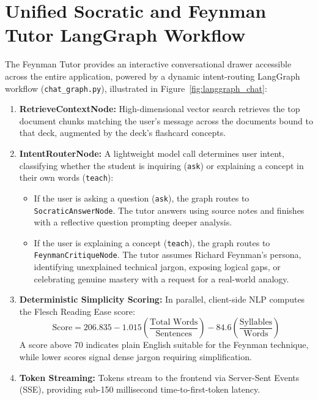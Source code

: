 \documentclass[12pt,a4paper,oneside]{report}
\begin{document}
\section{Unified Socratic and Feynman Tutor LangGraph Workflow}
The Feynman Tutor provides an interactive conversational drawer accessible across the entire application, powered by a dynamic intent-routing LangGraph workflow (\texttt{chat\_graph.py}), illustrated in Figure~\ref{fig:langgraph_chat}:
\begin{enumerate}
    \item \textbf{RetrieveContextNode:} High-dimensional vector search retrieves the top document chunks matching the user's message across the documents bound to that deck, augmented by the deck's flashcard concepts.
    \item \textbf{IntentRouterNode:} A lightweight model call determines user intent, classifying whether the student is inquiring (\texttt{ask}) or explaining a concept in their own words (\texttt{teach}):
    \begin{itemize}
        \item If the user is asking a question (\texttt{ask}), the graph routes to \texttt{SocraticAnswerNode}. The tutor answers using source notes and finishes with a reflective question prompting deeper analysis.
        \item If the user is explaining a concept (\texttt{teach}), the graph routes to \texttt{FeynmanCritiqueNode}. The tutor assumes Richard Feynman's persona, identifying unexplained technical jargon, exposing logical gaps, or celebrating genuine mastery with a request for a real-world analogy.
    \end{itemize}
    \item \textbf{Deterministic Simplicity Scoring:} In parallel, client-side NLP computes the Flesch Reading Ease score:
    \begin{equation}
        \text{Score} = 206.835 - 1.015 \left(\frac{\text{Total Words}}{\text{Sentences}}\right) - 84.6 \left(\frac{\text{Syllables}}{\text{Words}}\right)
    \end{equation}
    A score above 70 indicates plain English suitable for the Feynman technique, while lower scores signal dense jargon requiring simplification.
    \item \textbf{Token Streaming:} Tokens stream to the frontend via Server-Sent Events (SSE), providing sub-150 millisecond time-to-first-token latency.
\end{enumerate}
\end{document}
